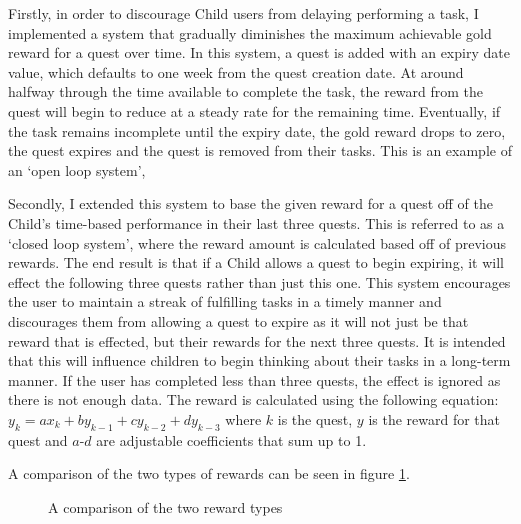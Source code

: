Firstly, in order to discourage Child users from delaying performing a task, I implemented a system that gradually diminishes the maximum achievable gold reward for a quest over time. 
In this system, a quest is added with an expiry date value, which defaults to one week from the quest creation date.
At around halfway through the time available to complete the task, the reward from the quest will begin to reduce at a steady rate for the remaining time.
Eventually, if the task remains incomplete until the expiry date, the gold reward drops to zero, the quest expires and the quest is removed from their tasks.
This is an example of an `open loop system', 

Secondly, I extended this system to base the given reward for a quest off of the Child's time-based performance in their last three quests.
This is referred to as a `closed loop system', where the reward amount is calculated based off of previous rewards.
The end result is that if a Child allows a quest to begin expiring, it will effect the following three quests rather than just this one.
This system encourages the user to maintain a streak of fulfilling tasks in a timely manner and discourages them from allowing a quest to expire as it will not just be that reward that is effected, but their rewards for the next three quests.
It is intended that this will influence children to begin thinking about their tasks in a long-term manner.
If the user has completed less than three quests, the effect is ignored as there is not enough data.
The reward is calculated using the following equation: $y_k = ax_k + by_{k-1} + cy_{k-2} + dy_{k-3}$ where $k$ is the quest, $y$ is the reward for that quest and $a$-$d$ are adjustable coefficients that sum up to 1.
 
A comparison of the two types of rewards can be seen in figure \ref{fig:rewardcomparison}.

\begin{figure}[ht]
\centering
{}
\caption{A comparison of the two reward types}
\label{fig:rewardcomparison}
\end{figure}

